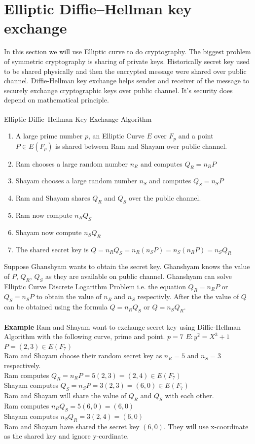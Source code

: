 \documentclass[a4paper,12pt]{report}
\begin{document}
\section{Elliptic Diﬃe–Hellman key exchange}
In this section we will use Elliptic curve to do cryptography. The biggest problem of symmetric cryptography is sharing of private keys. Historically secret key used to be shared physically and then the encrypted message were shared over public channel. Diffie-Hellman key exchange helps sender and receiver of the message to securely exchange cryptographic keys over public channel. It's security does depend on mathematical principle. \\\\
Elliptic Diﬃe–Hellman Key Exchange Algorithm
\begin{enumerate}
	\item A large prime number $p$, an Elliptic Curve $E$ over $F_p$ and a point $P \in E(F_p)$  is shared between Ram and Shayam over public channel.
	\item Ram chooses a large random number $n_R$ and computes $Q_R = n_R P$
	\item Shayam chooses a large random number $n_S$ and computes $Q_S = n_S P$
	\item Ram and Shayam shares $Q_R$ and $Q_S$ over the public channel.
	\item Ram now compute $n_R Q_S$
	\item Shayam now compute $n_S Q_R$
	\item The shared secret key is $Q=n_R Q_S=n_R (n_S P)=n_S (n_R P)=n_S Q_R$
\end{enumerate}
Suppose Ghanshyam wants to obtain the secret key. Ghanshyam knows the value of $P$, $Q_R$, $Q_S$ as they are available on public channel. Ghanshyam can solve Elliptic Curve Discrete Logarithm Problem i.e. the equation $Q_R = n_R P$ or $Q_S = n_S P$ to obtain the value of $n_R$ and $n_S$ respectivly. After the the value of $Q$ can be obtained using the formula $Q=n_R Q_S$ or $Q=n_S Q_R$. \\\\
\textbf{Example}
Ram and Shayam want to exchange secret key using Diffie-Hellman Algorithm with the following curve, prime and point.
$p=7$
$E:y^2=X^3+1$
$P=(2,3) \in E(F_7)$\\
Ram and Shayam choose their random secret key as $n_R=5$ and $n_S=3$ respectively.\\
Ram computes $Q_R = n_R P = 5(2,3)=(2,4) \in E(F_7)$\\
Shayam computes $Q_S = n_S P = 3(2,3)=(6,0)\in E(F_7)$\\
Ram and Shayam will share the value of $Q_R$ and $Q_S$ with each other.\\
Ram computes $n_R Q_S= 5 (6,0) = (6,0)$\\
Shayam computes $n_S Q_R= 3 (2,4) = (6,0)$\\
Ram and Shayam have shared the secret key $(6,0)$. They will use x-coordinate as the shared key and ignore y-cordinate.



\end{document}
